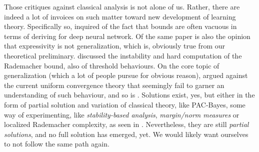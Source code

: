 Those critiques against classical analysis is not alone of us. Rather, there are indeed a lot of invoices on such matter toward new development of learning theory. Specifically so, \cite{zhang2017understandingdeeplearningrequires} inquired of the fact that bounds are often vacuous in terms of deriving for deep neural network. Of the same paper is also the opinion that expressivity is not generalization, which is, obviously true from our theoretical preliminary. \cite{truong2025rademachercomplexitybasedgeneralizationbounds} discussed the instability and hard computation of the Rademacher bound, also of threshold behaviours. On the core topic of generalization (which a lot of people pursue for obvious reason), \cite{nagarajan2021uniformconvergenceunableexplain} argued against the current uniform convergence theory that seemingly fail to garner an understanding of such behaviour, and so is \cite{tunali2019empirical}. Solutions exist, yes, but either in the form of partial solution and variation of classical theory, like PAC-Bayes, some way of experimenting, like \textit{stability-based analysis}, \textit{margin/norm measures} or localized Rademacher complexity, as seen in \cite{bartlett2005local,bartlett2017spectrally,bousquet2002stability,neyshabur2015norm}. Nevertheless, they are still \textit{partial solutions}, and no full solution has emerged, yet. We would likely want ourselves to not follow the same path again. 




